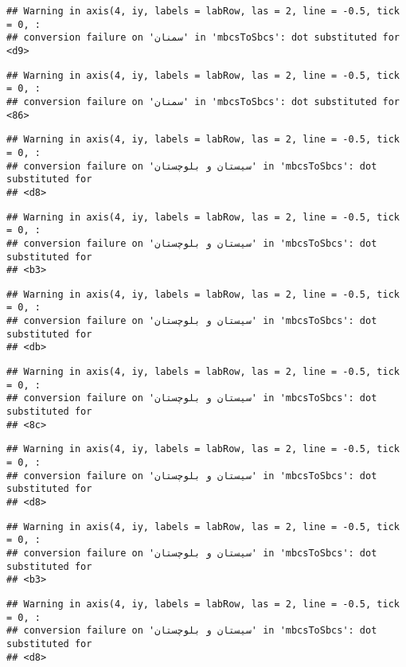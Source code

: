 \documentclass[
]{article}
\begin{document}
\begin{verbatim}
## Warning in axis(4, iy, labels = labRow, las = 2, line = -0.5, tick = 0, :
## conversion failure on 'سمنان' in 'mbcsToSbcs': dot substituted for <d9>
\end{verbatim}

\begin{verbatim}
## Warning in axis(4, iy, labels = labRow, las = 2, line = -0.5, tick = 0, :
## conversion failure on 'سمنان' in 'mbcsToSbcs': dot substituted for <86>
\end{verbatim}

\begin{verbatim}
## Warning in axis(4, iy, labels = labRow, las = 2, line = -0.5, tick = 0, :
## conversion failure on 'سیستان و بلوچستان' in 'mbcsToSbcs': dot substituted for
## <d8>
\end{verbatim}

\begin{verbatim}
## Warning in axis(4, iy, labels = labRow, las = 2, line = -0.5, tick = 0, :
## conversion failure on 'سیستان و بلوچستان' in 'mbcsToSbcs': dot substituted for
## <b3>
\end{verbatim}

\begin{verbatim}
## Warning in axis(4, iy, labels = labRow, las = 2, line = -0.5, tick = 0, :
## conversion failure on 'سیستان و بلوچستان' in 'mbcsToSbcs': dot substituted for
## <db>
\end{verbatim}

\begin{verbatim}
## Warning in axis(4, iy, labels = labRow, las = 2, line = -0.5, tick = 0, :
## conversion failure on 'سیستان و بلوچستان' in 'mbcsToSbcs': dot substituted for
## <8c>
\end{verbatim}

\begin{verbatim}
## Warning in axis(4, iy, labels = labRow, las = 2, line = -0.5, tick = 0, :
## conversion failure on 'سیستان و بلوچستان' in 'mbcsToSbcs': dot substituted for
## <d8>
\end{verbatim}

\begin{verbatim}
## Warning in axis(4, iy, labels = labRow, las = 2, line = -0.5, tick = 0, :
## conversion failure on 'سیستان و بلوچستان' in 'mbcsToSbcs': dot substituted for
## <b3>
\end{verbatim}

\begin{verbatim}
## Warning in axis(4, iy, labels = labRow, las = 2, line = -0.5, tick = 0, :
## conversion failure on 'سیستان و بلوچستان' in 'mbcsToSbcs': dot substituted for
## <d8>
\end{verbatim}
\end{document}

